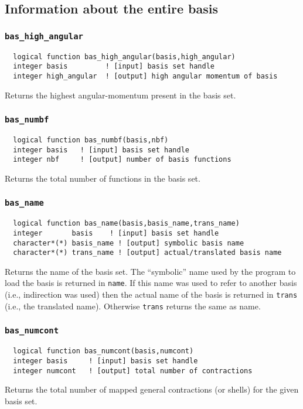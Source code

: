 \subsection{Information about the entire basis}

\subsubsection{{\tt bas\_high\_angular}}
\begin{verbatim}
  logical function bas_high_angular(basis,high_angular)
  integer basis         ! [input] basis set handle
  integer high_angular  ! [output] high angular momentum of basis
\end{verbatim}
Returns the highest angular-momentum present in the basis set.

\subsubsection{{\tt bas\_numbf}}
\begin{verbatim}
  logical function bas_numbf(basis,nbf)
  integer basis   ! [input] basis set handle         
  integer nbf     ! [output] number of basis functions
\end{verbatim}
Returns the total number of functions in the basis set.

\subsubsection{{\tt bas\_name}}
\begin{verbatim}
  logical function bas_name(basis,basis_name,trans_name)
  integer       basis    ! [input] basis set handle
  character*(*) basis_name ! [output] symbolic basis name
  character*(*) trans_name ! [output] actual/translated basis name
\end{verbatim}
Returns the name of the basis set.  The ``symbolic'' name used by the
program to load the basis is returned in {\tt name}.  If this name was
used to refer to another basis (i.e., indirection was used) then the
actual name of the basis is returned in {\tt trans} (i.e., the
translated name).  Otherwise {\tt trans} returns the same as name.

\subsubsection{{\tt bas\_numcont}}
\begin{verbatim}
  logical function bas_numcont(basis,numcont)
  integer basis     ! [input] basis set handle
  integer numcont   ! [output] total number of contractions
\end{verbatim}
Returns the total number of mapped general contractions (or shells)
for the given basis set.

